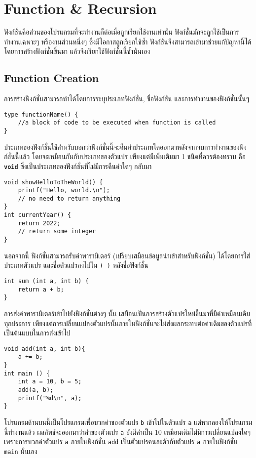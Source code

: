 \chapter{Function \& Recursion}
ฟังก์ชั่นคือส่วนของโปรแกรมที่จะทำงานก็ต่อเมื่อถูกเรียกใช้งานเท่านั้น ฟังก์ชั่นมักจะถูกใช้เป็นการทำงานเฉพาะๆ หรืองานส่วนหนึ่งๆ ซึ่งมีโอกาสถูกเรียกใช้ซ้ำ ฟังก์ชั่นจึงสามารถเข้ามาช่วยแก้ปัญหานี้ได้ โดยการสร้างฟังก์ชั่นขึ้นมา แล้วจึงเรียกใช้ฟังก์ชั่นนี้ซ้ำนั่นเอง

\section{Function Creation}
การสร้างฟังก์ชั่นสามารถทำได้โดยการระบุประเภทฟังก์ชั่น, ชื่อฟังก์ชั่น และการทำงานของฟังก์ชั่นนั้นๆ
\begin{lstlisting}
type functionName() {
	//a block of code to be executed when function is called
}
\end{lstlisting}
ประเภทของฟังก์ชั่นใช้สำหรับบอกว่าฟังก์ชั่นนี้จะคืนค่าประเภทใดออกมาหลังจากจบการทำงานของฟังก์ชั่นนี้แล้ว โดยจะเหมือนกันกับประเภทของตัวแปร เพียงแต่มีเพิ่มเติมมา 1 ชนิดที่ควรต้องทราบ คือ \textbf{\texttt{void}} ซึ่งเป็นประเภทของฟังก์ชั่นที่ไม่มีการคืนค่าใดๆ กลับมา
\begin{lstlisting}
void showHelloToTheWorld() {
	printf("Hello, world.\n");
    // no need to return anything
}
int currentYear() {
	return 2022;
    // return some integer
}
\end{lstlisting}

นอกจากนี้ ฟังก์ชั่นสามารถรับค่าพารามิเตอร์ (เปรียบเสมือนข้อมูลนำเข้าสำหรับฟังก์ชั่น) ได้โดยการใส่ประเภทตัวแปร และชื่อตัวแปรลงไปใน \texttt{( )} หลังชื่อฟังก์ชั่น
\begin{lstlisting}
int sum (int a, int b) {
	return a + b;
}
\end{lstlisting}

การส่งค่าพารามิเตอร์เข้าไปยังฟังก์ชั่นต่างๆ นั้น เสมือนเป็นการสร้างตัวแปรใหม่ขึ้นมาที่มีค่าเหมือนเดิมทุกประการ เพียงแต่การเปลี่ยนแปลงตัวแปรนั้นภายในฟังก์ชั่นจะไม่ส่งผลกระทบต่อค่าเดิมของตัวแปรที่เป็นต้นแบบในการส่งเข้าไป
\begin{lstlisting}
void add(int a, int b){
	a += b;
}
int main () {
	int a = 10, b = 5;
    add(a, b);
    printf("%d\n", a);
}
\end{lstlisting}
โปรแกรมด้านบนนี้เป็นโปรแกรมเพื่อบวกค่าของตัวแปร \texttt{b} เข้าไปในตัวแปร \texttt{a} แต่หากลองให้โปรแกรมนี้ทำงานแล้ว ผลลัพธ์จะออกมาว่าค่าของตัวแปร \texttt{a} ยังมีค่าเป็น 10 เหมือนเดิมไม่มีการเปลี่ยนแปลงใดๆ เพราะการบวกค่าตัวแปร \texttt{a} ภายในฟังก์ชั่น \texttt{add} เป็นตัวแปรคนละตัวกับตัวแปร \texttt{a} ภายในฟังก์ชั่น \texttt{main} นั่นเอง

